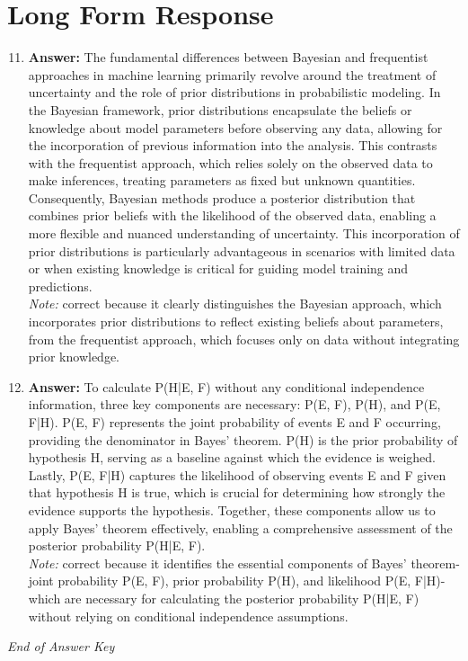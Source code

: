 \documentclass[12pt]{article}
\begin{document}
\section*{Long Form Response}
\begin{enumerate}[label=\arabic*.]
\setcounter{enumi}{10}
\item \textbf{Answer:} The fundamental differences between Bayesian and frequentist approaches in machine learning primarily revolve around the treatment of uncertainty and the role of prior distributions in probabilistic modeling. In the Bayesian framework, prior distributions encapsulate the beliefs or knowledge about model parameters before observing any data, allowing for the incorporation of previous information into the analysis. This contrasts with the frequentist approach, which relies solely on the observed data to make inferences, treating parameters as fixed but unknown quantities. Consequently, Bayesian methods produce a posterior distribution that combines prior beliefs with the likelihood of the observed data, enabling a more flexible and nuanced understanding of uncertainty. This incorporation of prior distributions is particularly advantageous in scenarios with limited data or when existing knowledge is critical for guiding model training and predictions.
\\ \textit{Note:} correct because it clearly distinguishes the Bayesian approach, which incorporates prior distributions to reflect existing beliefs about parameters, from the frequentist approach, which focuses only on data without integrating prior knowledge.
\item \textbf{Answer:} To calculate P(H|E, F) without any conditional independence information, three key components are necessary: P(E, F), P(H), and P(E, F|H). P(E, F) represents the joint probability of events E and F occurring, providing the denominator in Bayes' theorem. P(H) is the prior probability of hypothesis H, serving as a baseline against which the evidence is weighed. Lastly, P(E, F|H) captures the likelihood of observing events E and F given that hypothesis H is true, which is crucial for determining how strongly the evidence supports the hypothesis. Together, these components allow us to apply Bayes' theorem effectively, enabling a comprehensive assessment of the posterior probability P(H|E, F).
\\ \textit{Note:} correct because it identifies the essential components of Bayes' theorem-joint probability P(E, F), prior probability P(H), and likelihood P(E, F|H)-which are necessary for calculating the posterior probability P(H|E, F) without relying on conditional independence assumptions.
\end{enumerate}

\vfill
\noindent\textit{End of Answer Key}
\end{document}
